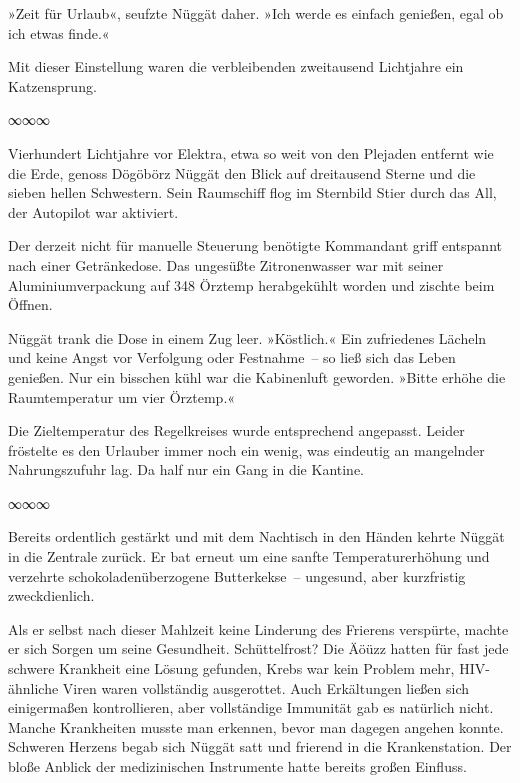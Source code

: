»Zeit für Urlaub«, seufzte Nüggät daher. »Ich werde es einfach genießen, egal ob ich etwas finde.«

Mit dieser Einstellung waren die verbleibenden zweitausend Lichtjahre ein Katzensprung.

\begin{center}
∞∞∞
\end{center}

Vierhundert Lichtjahre vor Elektra, etwa so weit von den Plejaden entfernt wie die Erde, genoss Dögöbörz Nüggät den Blick auf dreitausend Sterne und die sieben hellen Schwestern. Sein Raumschiff flog im Sternbild Stier durch das All, der Autopilot war aktiviert.

Der derzeit nicht für manuelle Steuerung benötigte Kommandant griff entspannt nach einer Getränkedose. Das ungesüßte Zitronenwasser war mit seiner Aluminiumverpackung auf 348 Örztemp herabgekühlt worden und zischte beim Öffnen.

Nüggät trank die Dose in einem Zug leer. »Köstlich.« Ein zufriedenes Lächeln und keine Angst vor Verfolgung oder Festnahme~– so ließ sich das Leben genießen. Nur ein bisschen kühl war die Kabinenluft geworden. »Bitte erhöhe die Raumtemperatur um vier Örztemp.«

Die Zieltemperatur des Regelkreises wurde entsprechend angepasst. Leider fröstelte es den Urlauber immer noch ein wenig, was eindeutig an mangelnder Nahrungszufuhr lag. Da half nur ein Gang in die Kantine.

\begin{center}
∞∞∞
\end{center}

Bereits ordentlich gestärkt und mit dem Nachtisch in den Händen kehrte Nüggät in die Zentrale zurück. Er bat erneut um eine sanfte Temperaturerhöhung und verzehrte schokoladenüberzogene Butterkekse~– ungesund, aber kurzfristig zweckdienlich.

Als er selbst nach dieser Mahlzeit keine Linderung des Frierens verspürte, machte er sich Sorgen um seine Gesundheit. Schüttelfrost? Die Äöüzz hatten für fast jede schwere Krankheit eine Lösung gefunden, Krebs war kein Problem mehr, HIV-ähnliche Viren waren vollständig ausgerottet. Auch Erkältungen ließen sich einigermaßen kontrollieren, aber vollständige Immunität gab es natürlich nicht. Manche Krankheiten musste man erkennen, bevor man dagegen angehen konnte. Schweren Herzens begab sich Nüggät satt und frierend in die Krankenstation. Der bloße Anblick der medizinischen Instrumente hatte bereits großen Einfluss.

